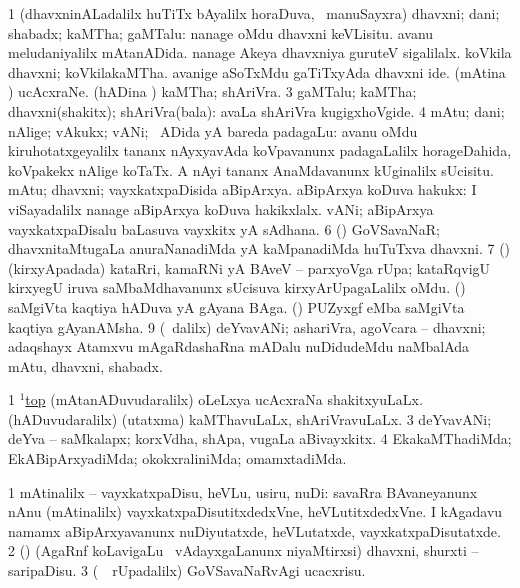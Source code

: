 \bentry 
{} 
\gl{\nA}
\expl{}
\bmng
\bnum
\num{1} (dhavxninALadalilx huTiTx bAyalilx horaDuva, \kanmu\ manuSayxra) dhavxni; dani; shabadx; kaMTha; gaMTalu:  nanage oMdu dhavxni keVLisitu.  avanu meludaniyalilx mAtanADida.  nanage Akeya dhavxniya guruteV sigalilalx.  koVkila dhavxni; koVkilakaMTha.  avanige aSoTxMdu gaTiTxyAda dhavxni ide. 
\banum
{} (mAtina \vi) ucAcxraNe. 
 (hADina \vi) kaMTha; shAriVra. 
\eanum
\numie
\num{3} gaMTalu; kaMTha; dhavxni(shakitx); shAriVra(bala):  avaLa shAriVra kugigxhoVgide. 
\num{4} mAtu; dani; nAlige; vAkukx; vANi; \kanmu\ ADida yA bareda padagaLu:  avanu oMdu kiruhotatxgeyalilx tananx nAyxyavAda koVpavanunx padagaLalilx horageDahida, koVpakekx nAlige koTaTx.  A nAyi tananx AnaMdavanunx kUginalilx sUcisitu. 
\banum
{} mAtu; dhavxni; vayxkatxpaDisida aBipArxya. 
 aBipArxya koDuva hakukx:  I viSayadalilx nanage aBipArxya koDuva hakikxlalx. 
 vANi; aBipArxya vayxkatxpaDisalu baLasuva vayxkitx yA sAdhana. 
\eanum
\numie
\num{6} (\dhavxni) GoVSavaNaR; dhavxnitaMtugaLa anuraNanadiMda yA kaMpanadiMda huTuTxva dhavxni. 
\num{7} (\vAyx) (kirxyApadada) kataRri, kamaRNi yA BAveV -- parxyoVga rUpa; kataRqvigU kirxyegU iruva saMbaMdhavanunx sUcisuva kirxyArUpagaLalilx oMdu. 
\banum
{} (\saM) saMgiVta kaqtiya hADuva yA gAyana BAga. 
 (\saM) PUZyxgf eMba saMgiVta kaqtiya gAyanAMsha. 
\eanum
\numie
\num{9} (\sA\ \bava dalilx) deYvavANi; ashariVra, agoVcara -- dhavxni; adaqshayx Atamxvu mAgaRdashaRna mADalu nuDidudeMdu naMbalAda mAtu, dhavxni, shabadx. 
\enum
\emng

\noindent 
\gl{\pagu}
\expl{}
\bmng
\bnum
\num{1}  \hyperref{kandict_t.pdf}{T}{top(1)16}{$^1$top}  
  
\banum
{} (mAtanADuvudaralilx) oLeLxya ucAcxraNa shakitxyuLaLx. 
 (hADuvudaralilx) (utatxma) kaMThavuLaLx, shAriVravuLaLx. 
\eanum
\numie
\num{3}  deYvavANi; deYva -- saMkalapx; korxVdha, shApa, \mo vugaLa aBivayxkitx. 
\num{4}  EkakaMThadiMda; EkABipArxyadiMda; okokxraliniMda; omamxtadiMda. 
\enum
\emng
\eentry

\bentry
{} 
\gl{\sakirx}
\expl{}
\bmng
\bnum
\num{1} mAtinalilx -- vayxkatxpaDisu, heVLu, usiru, nuDi:  savaRra BAvaneyanunx nAnu (mAtinalilx) vayxkatxpaDisutitxdedxVne, heVLutitxdedxVne.  I kAgadavu namamx aBipArxyavanunx nuDiyutatxde, heVLutatxde, vayxkatxpaDisutatxde. 
\num{2} (\saM) (AgaRnf koLavigaLu \mo\ vAdayxgaLanunx niyaMtirxsi) dhavxni, shurxti -- saripaDisu. 
\num{3} (\kanmu\ \BUkaq\ rUpadalilx) GoVSavaNaRvAgi ucacxrisu. 
\enum
\emng
\eentry

